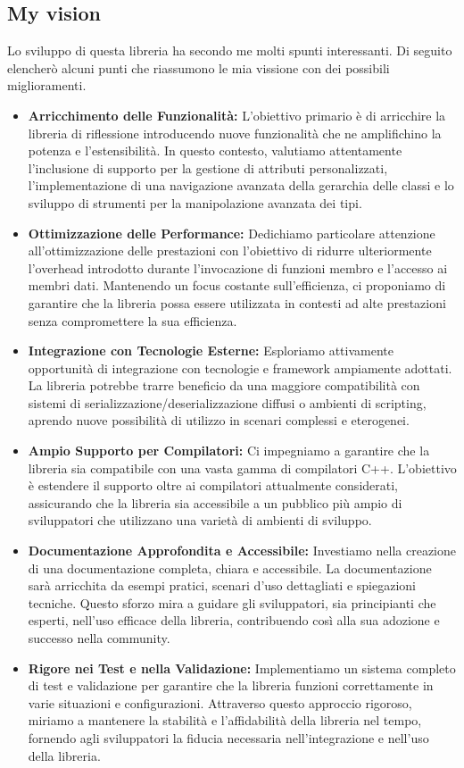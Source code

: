 \documentclass[11pt]{article}
\begin{document}
\begin{multicols*}{2}[\columnsep=1cm]
    \subsection{My vision}
    Lo sviluppo di questa libreria ha secondo me molti spunti interessanti. Di seguito elencherò alcuni punti che riassumono le mia vissione con dei possibili miglioramenti.
    \begin{itemize}
        \item \textbf{Arricchimento delle Funzionalità:} L'obiettivo primario è di arricchire la libreria di riflessione introducendo nuove funzionalità che ne amplifichino la potenza e l'estensibilità. In questo contesto, valutiamo attentamente l'inclusione di supporto per la gestione di attributi personalizzati, l'implementazione di una navigazione avanzata della gerarchia delle classi e lo sviluppo di strumenti per la manipolazione avanzata dei tipi.
        \item \textbf{Ottimizzazione delle Performance:} Dedichiamo particolare attenzione all'ottimizzazione delle prestazioni con l'obiettivo di ridurre ulteriormente l'overhead introdotto durante l'invocazione di funzioni membro e l'accesso ai membri dati. Mantenendo un focus costante sull'efficienza, ci proponiamo di garantire che la libreria possa essere utilizzata in contesti ad alte prestazioni senza compromettere la sua efficienza.
        \item \textbf{Integrazione con Tecnologie Esterne:} Esploriamo attivamente opportunità di integrazione con tecnologie e framework ampiamente adottati. La libreria potrebbe trarre beneficio da una maggiore compatibilità con sistemi di serializzazione/deserializzazione diffusi o ambienti di scripting, aprendo nuove possibilità di utilizzo in scenari complessi e eterogenei.
        \item \textbf{Ampio Supporto per Compilatori:} Ci impegniamo a garantire che la libreria sia compatibile con una vasta gamma di compilatori C++. L'obiettivo è estendere il supporto oltre ai compilatori attualmente considerati, assicurando che la libreria sia accessibile a un pubblico più ampio di sviluppatori che utilizzano una varietà di ambienti di sviluppo.
        \item \textbf{Documentazione Approfondita e Accessibile:} Investiamo nella creazione di una documentazione completa, chiara e accessibile. La documentazione sarà arricchita da esempi pratici, scenari d'uso dettagliati e spiegazioni tecniche. Questo sforzo mira a guidare gli sviluppatori, sia principianti che esperti, nell'uso efficace della libreria, contribuendo così alla sua adozione e successo nella community.
        \item \textbf{Rigore nei Test e nella Validazione:} Implementiamo un sistema completo di test e validazione per garantire che la libreria funzioni correttamente in varie situazioni e configurazioni. Attraverso questo approccio rigoroso, miriamo a mantenere la stabilità e l'affidabilità della libreria nel tempo, fornendo agli sviluppatori la fiducia necessaria nell'integrazione e nell'uso della libreria.
    \end{itemize}


\end{multicols*}
\end{document}

